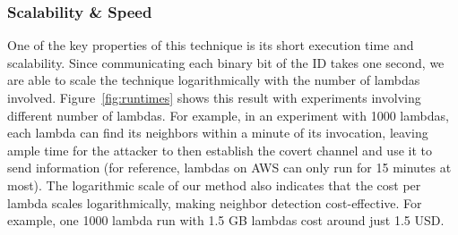 \subsubsection{Scalability \& Speed}
\label{sec:eval:scalability}
One of the key properties of this technique is its short execution time and
scalability. Since communicating each binary bit of the ID takes one second, we
are able to scale the technique logarithmically with the number of lambdas
involved. Figure~\ref{fig:runtimes} shows this result with experiments
involving different number of lambdas. For example, in an experiment with 1000
lambdas, each lambda can find its neighbors within a minute of its invocation,
leaving ample time for the attacker to then establish the covert channel and use
it to send information (for reference, lambdas on AWS can only run for 15
minutes at most).  The logarithmic scale of our method also indicates that the
cost per lambda scales logarithmically, making neighbor detection
cost-effective.  For example, one 1000 lambda run with 1.5 GB lambdas cost
around just 1.5 USD. 



